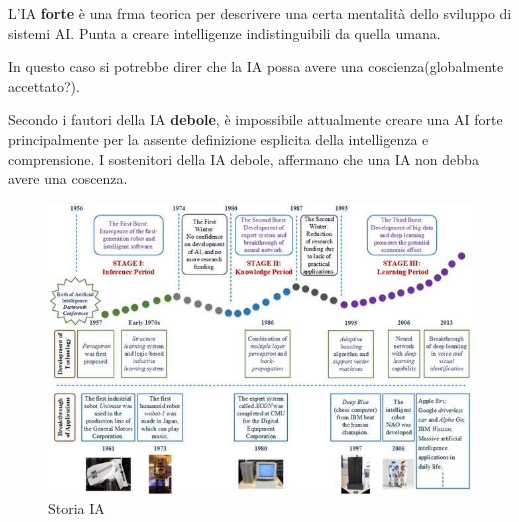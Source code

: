 L'IA \textbf{forte} è una frma teorica per descrivere una certa mentalità dello sviluppo di sistemi AI.
Punta a creare intelligenze indistinguibili da quella umana.

In questo caso si potrebbe direr che la IA possa avere una coscienza(globalmente accettato?).

Secondo i fautori della IA \textbf{debole}, è impossibile attualmente creare una AI forte principalmente per la
assente definizione esplicita della intelligenza e comprensione.
I sostenitori della IA debole, affermano che una IA non debba avere una coscenza.


\begin{figure}[H]
    \centering
    \includegraphics[width=1\linewidth]{imgs/11 - storia IA}
    \caption{Storia IA}
    \label{fig:storia_ia}
\end{figure}


